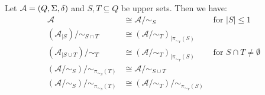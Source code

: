 \begin{proposition} \label{prelim:autmoata:Rees:prop:iso-eqns}
	Let $\mathcal A = (Q, \Sigma, \delta)$ and $S, T \subseteq Q$ be upper sets.	
	Then we have:
	\begin{align}
		\mathcal A & \cong \mathcal A / {\sim_S} & \text{ for } |S| \le 1  
		\label{prelim:Rees:S-at-most-one} \\
		 ( \mathcal A_{|S} ) / {\sim_{S\cap T}}
		& \cong  ( \mathcal A / {\sim_{T}} )_{|\pi_{\sim_{T}}(S)} 
		\label{prelim:eqn:Rees:ScapT} \\
		(\mathcal A_{|S\cup T}) / {\sim_T} & \cong  ( \mathcal A / {\sim_{T}} )_{|\pi_{\sim_{T}}(S)}  & \text{ for } S \cap T \ne \emptyset \label{prelim:eqn:Rees:ScapTScupT} \\
		( \mathcal A / {\sim_S} ) / {\sim_{\pi_{\sim_S}(T)}} & \cong \mathcal A / {\sim_{S \cup T}} 
		\label{prelim:aut:Rees:eqn:quot-ScupT} \\
		( \mathcal A / {\sim_S} ) / {\sim_{\pi_{\sim_S}(T)}} & \cong ( \mathcal A / {\sim_T} ) / {\sim_{\pi_{\sim_T}(S)}} \label{prelim:aut:Rees:eqn:quotients-commute}	
	\end{align} 
\end{proposition}
